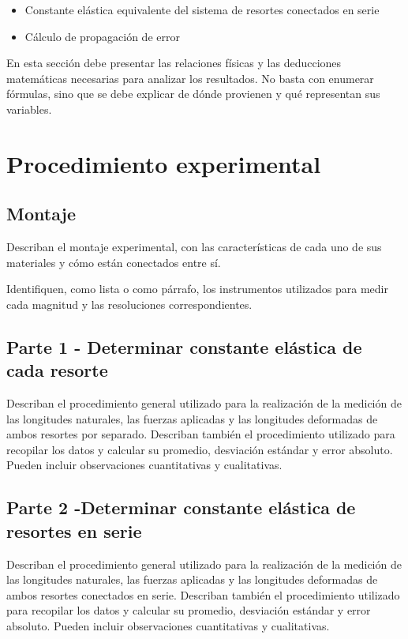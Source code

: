 \documentclass[12pt,a4paper]{article}
\begin{document}
\begin{itemize}
    \item Constante elástica equivalente del sistema de resortes conectados en serie
    \item Cálculo de propagación de error
\end{itemize}

En esta sección debe presentar las relaciones físicas y las deducciones matemáticas necesarias para analizar los resultados. No basta con enumerar fórmulas, sino que se debe explicar de dónde provienen y qué representan sus variables.

\section{Procedimiento experimental}

\subsection{Montaje} \label{Montaje}

Describan el montaje experimental, con las características de cada uno de sus materiales y cómo están conectados entre sí.

Identifiquen, como lista o como párrafo, los instrumentos utilizados para medir cada magnitud y las resoluciones correspondientes.

\subsection{Parte 1 - Determinar constante elástica de cada resorte} \label{Procedimiento-Parte-1}

Describan el procedimiento general utilizado para la realización de la medición de las longitudes naturales, las fuerzas aplicadas y las longitudes deformadas de ambos resortes por separado. Describan también el procedimiento utilizado para recopilar los datos y calcular su promedio, desviación estándar y error absoluto. Pueden incluir observaciones cuantitativas y cualitativas.

\subsection{Parte 2 -Determinar constante elástica de resortes en serie} \label{Procedimiento-Parte-2}

Describan el procedimiento general utilizado para la realización de la medición de las longitudes naturales, las fuerzas aplicadas y las longitudes deformadas de ambos resortes conectados en serie. Describan también el procedimiento utilizado para recopilar los datos y calcular su promedio, desviación estándar y error absoluto. Pueden incluir observaciones cuantitativas y cualitativas.
\end{document}
